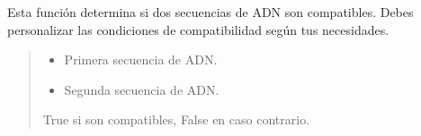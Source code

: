 \documentclass[letterpaper,10pt,spanish]{sphinxmanual}
\begin{document}
\begin{fulllineitems}
\label{\detokenize{multiplex:multiplex.are_sequences_compatible}}
\pysigstartsignatures
{}
\pysigstopsignatures
\sphinxAtStartPar
Esta función determina si dos secuencias de ADN son compatibles. 
Debes personalizar las condiciones de compatibilidad según tus necesidades.
\begin{quote}\begin{description}
\begin{itemize}
\item {} 
\sphinxAtStartPar
{} \textendash{} Primera secuencia de ADN.

\item {} 
\sphinxAtStartPar
{} \textendash{} Segunda secuencia de ADN.

\end{itemize}

\sphinxAtStartPar
True si son compatibles, False en caso contrario.

\end{description}\end{quote}

\end{fulllineitems}

\end{document}
